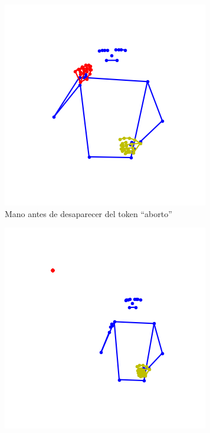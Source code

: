 \begin{figure}[t]
	\begin{subfigure}[t]{0.3\textwidth}
	\centering
		\includegraphics[align=t,width=0.9\linewidth, height =0.9\linewidth]{Graphics/mano_antes_desaparecer.png}
		\caption{Mano antes de desaparecer del token ``aborto''}
		\label{f:mano_antes_desaparecer}
	\end{subfigure}
	\begin{subfigure}[t]{0.3\textwidth}
	\centering
		\includegraphics[align=t,width=0.9\linewidth, height =0.9\linewidth]{Graphics/mano_desaparecida.png}

\end{subfigure}
\end{figure}
